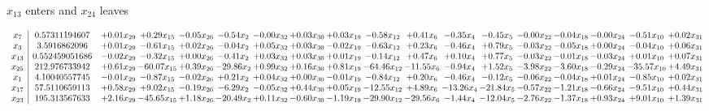 \documentclass[9pt]{article}
\begin{document}
 $ x_{13} $ enters and $ x_{24} $ leaves 

 \[\begin{array}{c| c c@{\hskip 2pt} c@{\hskip 2pt} c@{\hskip 2pt} c@{\hskip 2pt} c@{\hskip 2pt} c@{\hskip 2pt} c@{\hskip 2pt} c@{\hskip 2pt} c@{\hskip 2pt} c@{\hskip 2pt} c@{\hskip 2pt} c@{\hskip 2pt} c@{\hskip 2pt} c@{\hskip 2pt} c@{\hskip 2pt} c@{\hskip 2pt} }
 x_{7}   &  0.57311194607 & +  0.01 x_{29} & +  0.29 x_{15} & -0.05 x_{26} & -0.54 x_{2} & -0.00 x_{32} & +  0.03 x_{30} & +  0.03 x_{19} & -0.58 x_{12} & +  0.41 x_{6} & -0.35 x_{4} & -0.45 x_{5} & -0.00 x_{22} & -0.04 x_{18} & -0.00 x_{24} & -0.51 x_{10} & +  0.02 x_{31}\\
 x_{3}   &  3.5916862096 & +  0.01 x_{29} & -0.61 x_{15} & +  0.02 x_{26} & -0.04 x_{2} & +  0.05 x_{32} & +  0.03 x_{30} & -0.02 x_{19} & -0.63 x_{12} & +  0.23 x_{6} & -0.46 x_{4} & +  0.79 x_{5} & -0.03 x_{22} & -0.05 x_{18} & +  0.00 x_{24} & -0.04 x_{10} & +  0.06 x_{31}\\
 x_{13}   &  0.552459051686 & -0.02 x_{29} & -0.32 x_{15} & +  0.00 x_{26} & -0.41 x_{2} & +  0.03 x_{32} & +  0.03 x_{30} & +  0.01 x_{19} & -0.14 x_{12} & +  0.47 x_{6} & +  0.10 x_{4} & +  0.77 x_{5} & -0.03 x_{22} & -0.01 x_{18} & -0.03 x_{24} & +  0.01 x_{10} & +  0.07 x_{31}\\
 x_{25}   &  212.976733942 & +  0.61 x_{29} & -60.07 x_{15} & +  0.39 x_{26} & -29.86 x_{2} & +  0.99 x_{32} & +  0.16 x_{30} & +  0.81 x_{19} & -64.46 x_{12} & -11.55 x_{6} & -0.94 x_{4} & +  1.52 x_{5} & -3.98 x_{22} & -3.60 x_{18} & -0.29 x_{24} & -35.57 x_{10} & +  4.49 x_{31}\\
 x_{1}   &  4.10040557745 & -0.01 x_{29} & -0.87 x_{15} & -0.02 x_{26} & +  0.21 x_{2} & +  0.04 x_{32} & +  0.00 x_{30} & -0.01 x_{19} & -0.84 x_{12} & +  0.20 x_{6} & -0.46 x_{4} & -0.12 x_{5} & -0.06 x_{22} & -0.04 x_{18} & +  0.01 x_{24} & -0.85 x_{10} & +  0.02 x_{31}\\
 x_{17}   &  57.5110659113 & +  0.58 x_{29} & +  9.02 x_{15} & -0.19 x_{26} & -6.29 x_{2} & -0.05 x_{32} & +  0.44 x_{30} & +  0.05 x_{19} & -12.55 x_{12} & +  4.89 x_{6} & -13.26 x_{4} & -21.84 x_{5} & -0.57 x_{22} & -1.21 x_{18} & -0.66 x_{24} & -9.51 x_{10} & +  0.44 x_{31}\\
 x_{23}   &  195.313567633 & +  2.16 x_{29} & -45.65 x_{15} & +  1.18 x_{26} & -20.49 x_{2} & +  0.11 x_{32} & -0.60 x_{30} & -1.19 x_{19} & -29.90 x_{12} & -29.56 x_{6} & -1.44 x_{4} & -12.04 x_{5} & -2.76 x_{22} & -1.37 x_{18} & +  0.93 x_{24} & +  9.01 x_{10} & +  1.39 x_{31}\\

\end{array}\]
\end{document}
